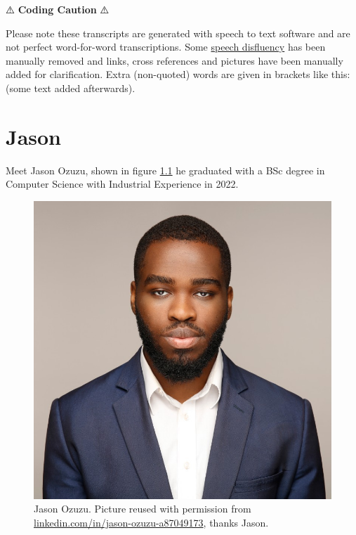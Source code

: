 \documentclass[
]{book}
\begin{document}
⚠️ \textbf{Coding Caution} ⚠️

Please note these transcripts are generated with speech to text software and are not perfect word-for-word transcriptions. Some \href{https://en.wikipedia.org/wiki/Speech_disfluency}{speech disfluency} has been manually removed and links, cross references and pictures have been manually added for clarification. Extra (non-quoted) words are given in brackets like this: (some text added afterwards).

\hypertarget{jason}{%
\chapter{Jason}\label{jason}}

Meet Jason Ozuzu, shown in figure \ref{fig:jason-fig} he graduated with a BSc degree in Computer Science with Industrial Experience in 2022.

\begin{figure}

{\centering \includegraphics[width=1\linewidth]{images/jason} 

}

\caption{Jason Ozuzu. Picture reused with permission from \href{https://www.linkedin.com/in/jason-ozuzu-a87049173/}{linkedin.com/in/jason-ozuzu-a87049173}, thanks Jason.}\label{fig:jason-fig}
\end{figure}
\end{document}
